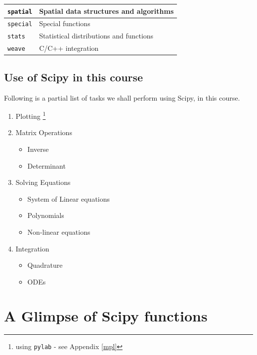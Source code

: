 \documentclass{article}
\begin{document}
\begin{table}
\begin{tabular}{|l|l|}
\hline

\texttt{spatial} & Spatial data structures and algorithms\\

\hline

\texttt{special} & Special functions\\

\hline

\texttt{stats} & Statistical distributions and functions\\

\hline

\texttt{weave} & C/C++ integration\\

\hline
\end{tabular}
\end{table}

\subsection{Use of Scipy in this course}
Following is a partial list of tasks we shall perform using Scipy, in
this course.

\begin{enumerate}
  \item Plotting \footnote{using \texttt{pylab} - see Appendix
    \ref{mpl}}
  \item Matrix Operations
  \begin{itemize}
    \item Inverse
    \item Determinant
  \end{itemize}
  \item Solving Equations
  \begin{itemize}
    \item System of Linear equations
    \item Polynomials
    \item Non-linear equations
  \end{itemize}
  \item Integration 
  \begin{itemize}
    \item Quadrature
    \item ODEs
  \end{itemize}
\end{enumerate}
\section{A Glimpse of Scipy functions}
\end{document}

